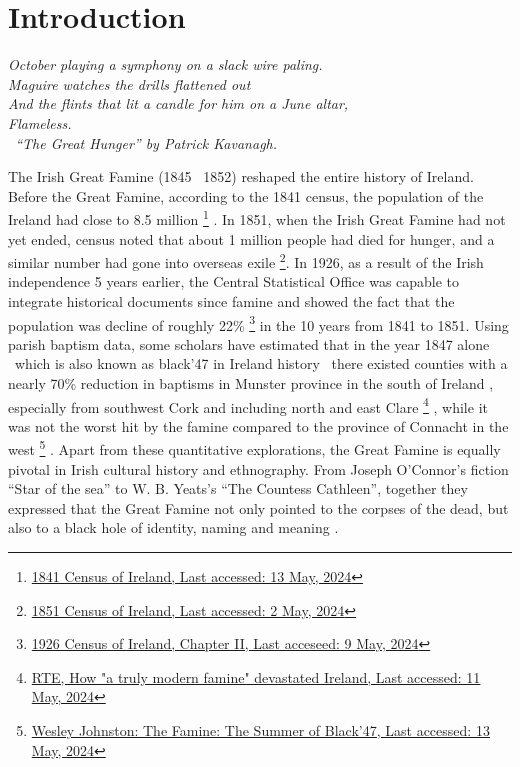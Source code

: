 \chapter{Introduction}
\textit{October playing a symphony on a slack wire paling.\\
Maguire watches the drills flattened out\\
And the flints that lit a candle for him on a June altar,\\
Flameless. \\
\textemdash\ ``The Great Hunger'' by Patrick Kavanagh.} \citep{Kavanagh_Quinn_2006a}
\vspace{.2cm}

The Irish Great Famine (1845 \textendash\ 1852) reshaped the entire history of Ireland. Before the Great Famine, according to the 1841 census, the population of the Ireland had close to 8.5 million
\footnote{
	\href{https://www.cso.ie/en/statistics/historicalreports/census1841/}{1841 Census of Ireland, Last accessed: 13 May, 2024}
}
. In 1851, when the Irish Great Famine had not yet ended, census noted that about 1 million people had died for hunger, and a similar number had gone into overseas exile
\footnote{
	\href{https://www.cso.ie/en/statistics/historicalreports/census1851/}{1851 Census of Ireland, Last accessed: 2 May, 2024}
}. In 1926, as a result of the Irish independence 5 years earlier, the Central Statistical Office was capable to integrate historical documents since famine and showed the fact that the population was decline of roughly 22\%
\footnote{
	\href{https://www.cso.ie/en/media/csoie/census/census1926results/volume10/C_1926_V10_Chapter_II.pdf}{1926 Census of Ireland, Chapter II, Last acceseed: 9 May, 2024}
} in the 10 years from 1841 to 1851. Using parish baptism data, some scholars have estimated that in the year 1847 alone \textendash\ which is also known as black'47 in Ireland history \textendash\ there existed counties with a nearly 70\% reduction in baptisms in Munster province in the south of Ireland \citep{cousens1960regional}, especially from southwest Cork and including north and east Clare
\footnote{
	\href{https://www.rte.ie/history/the-great-irish-famine/2020/0629/1150367-the-great-irish-famine/}{RTE, How "a truly modern famine" devastated Ireland, Last accessed: 11 May, 2024}
}
, while it was not the worst hit by the famine compared to the province of Connacht in the west
\footnote{
	\href{https://www.wesleyjohnston.com/users/ireland/past/famine/summer_1847.html}{Wesley Johnston: The Famine: The Summer of Black'47, Last accessed: 13 May, 2024}
}
. Apart from these quantitative explorations, the Great Famine is equally pivotal in Irish cultural history and ethnography. From Joseph O'Connor's fiction ``Star of the sea'' to W. B. Yeats's ``The Countess Cathleen'', together they expressed that the Great Famine not only pointed to the corpses of the dead, but also to a black hole of identity, naming and meaning \citep{luchen41naming}. 

